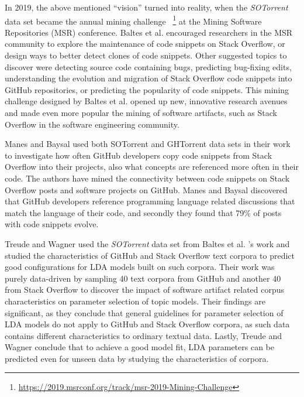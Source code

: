         In 2019, the above mentioned ``vision'' turned into reality, when the \emph{SOTorrent} data set became the annual mining challenge ~\footnote{\url{https://2019.msrconf.org/track/msr-2019-Mining-Challenge}} at the Mining Software Repositories (MSR) conference. Baltes et al. \cite{baltes2019sotorrent} encouraged researchers in the MSR community to explore the maintenance of code snippets on Stack Overflow, or design ways to better detect clones of code snippets. Other suggested topics to discover were detecting source code containing bugs, predicting bug-fixing edits, understanding the evolution and migration of Stack Overflow code snippets into GitHub repositories, or predicting the popularity of code snippets. This mining challenge designed by Baltes et al. \cite{baltes2019sotorrent} opened up new, innovative research avenues and made even more popular the mining of software artifacts, such as Stack Overflow in the software engineering community. 
        
        Manes and Baysal \cite{manes2019often} used both SOTorrent \cite{baltes2019sotorrent} and GHTorrent \cite{gousios2013ghtorent} data sets in their work to investigate how often GitHub developers copy code snippets from Stack Overflow into their projects, also what concepts are referenced more often in their code. The authors have mined the connectivity between code snippets on Stack Overflow posts and software projects on GitHub. Manes and Baysal \cite{manes2019often} discovered that GitHub developers reference programming language related discussions that match the language of their code, and secondly they found that 79\% of posts with code snippets evolve.
        
        Treude and Wagner \cite{treude2019predicting} used the \emph{SOTorrent} data set from Baltes et al. \cite{baltes2019sotorrent}'s work and studied the characteristics of GitHub and Stack Overflow text corpora to predict good configurations for LDA models built on such corpora. Their work was purely data-driven by sampling 40 text corpora from GitHub and another 40 from Stack Overflow to discover the impact of software artifact related corpus characteristics on parameter selection of topic models. Their findings are significant, as they conclude that general guidelines for parameter selection of LDA models do not apply to GitHub and Stack Overflow corpora, as such data contains different characteristics to ordinary textual data. Lastly, Treude and Wagner conclude that to achieve a good model fit, LDA parameters can be predicted even for unseen data by studying the characteristics of corpora.
        
